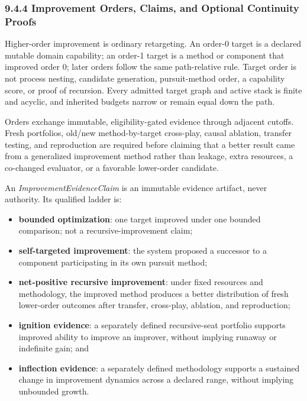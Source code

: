 \documentclass[
  11pt,
]{article}
\providecommand{\tightlist}{%
  \setlength{\itemsep}{0pt}\setlength{\parskip}{0pt}}
\begin{document}
\hypertarget{continuity-proofs-the-cryptographic-chain}{%
\subsubsection{9.4.4 Improvement Orders, Claims, and Optional Continuity
Proofs}\label{continuity-proofs-the-cryptographic-chain}}

Higher-order improvement is ordinary retargeting. An order-0 target is a
declared mutable domain capability; an order-1 target is a method or component
that improved order 0; later orders follow the same path-relative rule. Target
order is not process nesting, candidate generation, pursuit-method order, a
capability score, or proof of recursion. Every admitted target graph and active
stack is finite and acyclic, and inherited budgets narrow or remain equal down
the path.

Orders exchange immutable, eligibility-gated evidence through adjacent
cutoffs. Fresh portfolios, old/new method-by-target cross-play, causal ablation,
transfer testing, and reproduction are required before claiming that a better
result came from a generalized improvement method rather than leakage, extra
resources, a co-changed evaluator, or a favorable lower-order candidate.

An \emph{ImprovementEvidenceClaim} is an immutable evidence artifact, never
authority. Its qualified ladder is:

\begin{itemize}
\tightlist
\item
  \textbf{bounded optimization}: one target improved under one bounded
  comparison; not a recursive-improvement claim;
\item
  \textbf{self-targeted improvement}: the system proposed a successor to a
  component participating in its own pursuit method;
\item
  \textbf{net-positive recursive improvement}: under fixed resources and
  methodology, the improved method produces a better distribution of fresh
  lower-order outcomes after transfer, cross-play, ablation, and reproduction;
\item
  \textbf{ignition evidence}: a separately defined recursive-seat portfolio
  supports improved ability to improve an improver, without implying runaway
  or indefinite gain; and
\item
  \textbf{inflection evidence}: a separately defined methodology supports a
  sustained change in improvement dynamics across a declared range, without
  implying unbounded growth.
\end{itemize}
\end{document}
